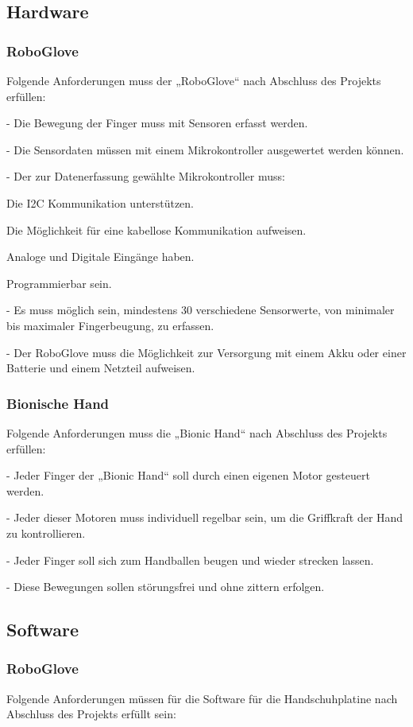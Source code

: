 \documentclass[11pt]{article}
\begin{document}
\subsection{Hardware}
\subsubsection{RoboGlove}
Folgende Anforderungen muss der „RoboGlove“ nach Abschluss des Projekts erfüllen:

-	Die Bewegung der Finger muss mit Sensoren erfasst werden.

-	Die Sensordaten müssen mit einem Mikrokontroller ausgewertet werden können.

-	Der zur Datenerfassung gewählte Mikrokontroller muss:

Die I2C Kommunikation unterstützen.

Die Möglichkeit für eine kabellose Kommunikation aufweisen.

Analoge und Digitale Eingänge haben.

Programmierbar sein.

-	Es muss möglich sein, mindestens 30 verschiedene Sensorwerte, von minimaler bis maximaler Fingerbeugung, zu erfassen.

-	Der RoboGlove muss die Möglichkeit zur Versorgung mit einem Akku oder einer Batterie und einem Netzteil aufweisen. 

\subsubsection{Bionische Hand}
Folgende Anforderungen muss die „Bionic Hand“ nach Abschluss des Projekts erfüllen:

-	Jeder Finger der „Bionic Hand“ soll durch einen eigenen Motor gesteuert werden.

-	Jeder dieser Motoren muss individuell regelbar sein, um die Griffkraft der Hand zu kontrollieren.

-	Jeder Finger soll sich zum Handballen beugen und wieder strecken lassen.

-	Diese Bewegungen sollen störungsfrei und ohne zittern erfolgen.


\subsection{Software}
\subsubsection{RoboGlove}
Folgende Anforderungen müssen für die Software für die Handschuhplatine nach Abschluss des Projekts erfüllt sein:
\end{document}
